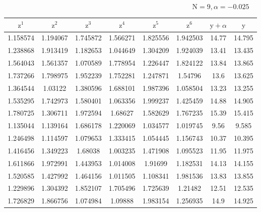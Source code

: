 \vspace{-1\baselineskip}

\begin{equation*}
    \textrm{N} = 9, \alpha = -0.025
\end{equation*}

\renewcommand{\arraystretch}{0.65}
\begin{center}
    \begin{tabular}{ | c | c | c | c | c | c | c | c | } 
      \hline
      $\textrm{z}^1$ & $\textrm{z}^2$ & $\textrm{z}^3$ & $\textrm{z}^4$ & $\textrm{z}^5$ & $\textrm{z}^6$ & $\textrm{y} + \alpha$ & $\textrm{y}$ \\
      \hline
      1.158574 & 1.194067 & 1.745872 & 1.566271 & 1.825556 & 1.942503 & 14.77 & 14.795 \\ 
      \hline 
      1.238868 & 1.913419 & 1.182653 & 1.044649 & 1.304209 & 1.924039 & 13.41 & 13.435 \\ 
      \hline 
      1.564043 & 1.561357 & 1.070589 & 1.778954 & 1.226447 & 1.824122 & 13.84 & 13.865 \\ 
      \hline 
      1.737266 & 1.798975 & 1.952239 & 1.752281 & 1.247871 & 1.54796 & 13.6 & 13.625 \\ 
      \hline 
      1.364544 & 1.03122 & 1.380596 & 1.688101 & 1.987396 & 1.058504 & 13.23 & 13.255 \\ 
      \hline 
      1.535295 & 1.742973 & 1.580401 & 1.063356 & 1.999237 & 1.425459 & 14.88 & 14.905 \\ 
      \hline 
      1.780725 & 1.306711 & 1.972594 & 1.68627 & 1.582629 & 1.767235 & 15.39 & 15.415 \\ 
      \hline 
      1.135044 & 1.139164 & 1.686178 & 1.220069 & 1.034577 & 1.019745 & 9.56 & 9.585 \\ 
      \hline 
      1.246498 & 1.114597 & 1.079653 & 1.333415 & 1.054445 & 1.156743 & 10.37 & 10.395 \\ 
      \hline 
      1.416456 & 1.349223 & 1.68038 & 1.003235 & 1.471908 & 1.095523 & 11.95 & 11.975 \\ 
      \hline 
      1.611866 & 1.972991 & 1.443953 & 1.014008 & 1.91699 & 1.182531 & 14.13 & 14.155 \\ 
      \hline 
      1.520585 & 1.427992 & 1.464156 & 1.011505 & 1.108341 & 1.981536 & 13.83 & 13.855 \\ 
      \hline 
      1.229896 & 1.304392 & 1.852107 & 1.705496 & 1.725639 & 1.21482 & 12.51 & 12.535 \\ 
      \hline 
      1.726829 & 1.866756 & 1.074984 & 1.09888 & 1.983154 & 1.256935 & 14.9 & 14.925 \\ 

\end{tabular}
\end{center}
